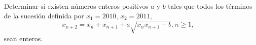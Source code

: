 Determinar si existen números enteros positivos $a$ y $b$ tales que todos los términos de la sucesión definida por $x_1 = 2010$, $x_2 = 2011$,
\[x_{n+2} = x_n + x_{n+1} + a\sqrt{x_n x_{n+1} + b}, n \geq 1,\]
sean enteros.
